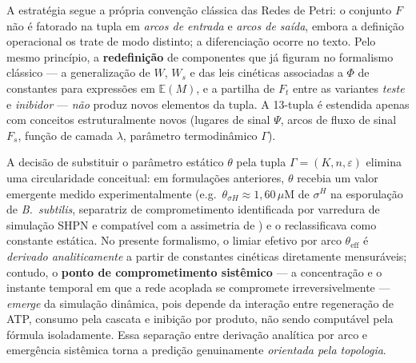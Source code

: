 \begin{remark}
\label{rem:refinamento-textual}
A estratégia segue a própria convenção clássica das Redes de Petri: o
conjunto $F$ não é fatorado na tupla em \emph{arcos de entrada} e
\emph{arcos de saída}, embora a definição operacional os trate de modo
distinto; a diferenciação ocorre no texto. Pelo mesmo princípio, a
\textbf{redefinição} de componentes que já figuram no formalismo clássico
— a generalização de $W$, $W_s$ e das leis cinéticas associadas a $\Phi$
de constantes para expressões em $\mathbb{E}(M)$, e a partilha de $F_t$
entre as variantes \emph{teste} e \emph{inibidor} — \emph{não} produz
novos elementos da tupla. A 13-tupla é estendida apenas com conceitos
estruturalmente novos (lugares de sinal $\Psi$, arcos de fluxo de sinal
$F_s$, função de camada $\lambda$, parâmetro termodinâmico $\Gamma$).
\end{remark}

A decisão de substituir o parâmetro estático $\theta$ pela tupla
$\Gamma = (K, n, \varepsilon)$ elimina uma circularidade conceitual: em
formulações anteriores, $\theta$ recebia um valor emergente medido
experimentalmente (e.g.\ $\theta_{\sigma H} \approx 1{,}60\,\mu$M de $\sigma^H$
na esporulação de \textit{B.~subtilis}, separatriz de comprometimento
identificada por varredura de simulação SHPN e compatível com a assimetria
de \textcite{Fujita2005}) e o reclassificava
como constante estática.  No presente formalismo, o limiar efetivo por arco
$\theta_{\mathrm{eff}}$ é \emph{derivado analiticamente} a partir de
constantes cinéticas diretamente mensuráveis; contudo, o \textbf{ponto de
comprometimento sistêmico} --- a concentração e o instante temporal em que a
rede acoplada se compromete irreversivelmente --- \emph{emerge} da simulação
dinâmica, pois depende da interação entre regeneração de ATP, consumo pela
cascata e inibição por produto, não sendo computável pela fórmula isoladamente.
Essa separação entre derivação analítica por arco e emergência sistêmica torna
a predição genuinamente \emph{orientada pela topologia}.

